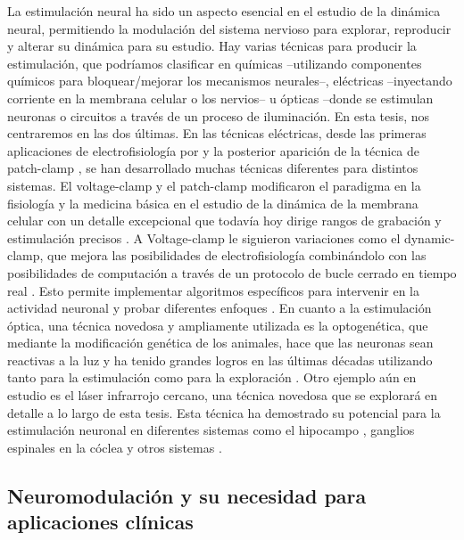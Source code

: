 La estimulación neural ha sido un aspecto esencial en el estudio de la dinámica neural, permitiendo la modulación del sistema nervioso para explorar, reproducir y alterar su dinámica para su estudio. Hay varias técnicas para producir la estimulación, que podríamos clasificar en químicas --utilizando componentes químicos para bloquear/mejorar los mecanismos neurales--, eléctricas --inyectando corriente en la membrana celular o los nervios-- u ópticas --donde se estimulan neuronas o circuitos a través de un proceso de iluminación. En esta tesis, nos centraremos en las dos últimas. En las técnicas eléctricas, desde las primeras aplicaciones de electrofisiología por \cite{neher_single-channel_1976} y la posterior aparición de la técnica de patch-clamp \cite{hamill_improved_1981}, se han desarrollado muchas técnicas diferentes para distintos sistemas. El voltage-clamp y el patch-clamp modificaron el paradigma en la fisiología y la medicina básica en el estudio de la dinámica de la membrana celular con un detalle excepcional que todavía hoy dirige rangos de grabación y estimulación precisos \parencite{hamill_improved_1981}. A Voltage-clamp le siguieron variaciones como el dynamic-clamp, que mejora las posibilidades de electrofisiología combinándolo con las posibilidades de computación a través de un protocolo de bucle cerrado en tiempo real \parencite{nowotny_dynamic_2022}. Esto permite implementar algoritmos específicos para intervenir en la actividad neuronal y probar diferentes enfoques \parencite{chamorro_generalization_2012}. En cuanto a la estimulación óptica, una técnica novedosa y ampliamente utilizada es la optogenética, que mediante la modificación genética de los animales, hace que las neuronas sean reactivas a la luz y ha tenido grandes logros en las últimas décadas utilizando tanto para la estimulación como para la exploración \parencite{chen_roles_2022}. Otro ejemplo aún en estudio es el láser infrarrojo cercano, una técnica novedosa que se explorará en detalle a lo largo de esta tesis. Esta técnica ha demostrado su potencial para la estimulación neuronal en diferentes sistemas como el hipocampo \parencite{liang_temperature-dependent_2009}, ganglios espinales en la cóclea \cite{goyal_acute_2012, barrett_pulsed_2018, brown_thermal_2020} y otros sistemas \parencite{shapiro_infrared_2012, cayce_infrared_2014, begeng_activity_2022}.

\subsection{Neuromodulación y su necesidad para aplicaciones clínicas}

